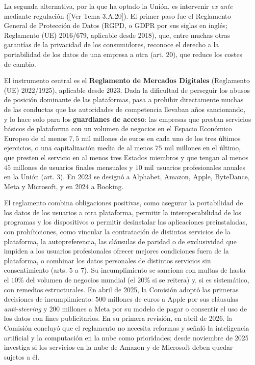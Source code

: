 \documentclass[10pt,a4paper]{article}
\newcommand{\authorfont}[1]{{\fontfamily{EBGaramond-TLF}\selectfont #1}}
\begin{document}
La segunda alternativa, por la que ha optado la Unión, es intervenir \textit{ex ante} mediante regulación ([\authorfont{Ver Tema 3.A.20}]). El primer paso fue el Reglamento General de Protección de Datos (RGPD, o GDPR por sus siglas en inglés; Reglamento (UE) 2016/679, aplicable desde 2018), que, entre muchas otras garantías de la privacidad de los consumidores, reconoce el derecho a la portabilidad de los datos de una empresa a otra (art. $20$), que reduce los costes de cambio.

El instrumento central es el \textbf{Reglamento de Mercados Digitales} (Reglamento (UE) 2022/1925), aplicable desde 2023. Dada la dificultad de perseguir los abusos de posición dominante de las plataformas, pasa a prohibir directamente muchas de las conductas que las autoridades de competencia llevaban años sancionando, y lo hace solo para los \textbf{guardianes de acceso}: las empresas que prestan servicios básicos de plataforma con un volumen de negocios en el Espacio Económico Europeo de al menos $7,5$ mil millones de euros en cada uno de los tres últimos ejercicios, o una capitalización media de al menos $75$ mil millones en el último, que presten el servicio en al menos tres Estados miembros y que tengan al menos $45$ millones de usuarios finales mensuales y $10$ mil usuarios profesionales anuales en la Unión (art. $3$). En 2023 se designó a Alphabet, Amazon, Apple, ByteDance, Meta y Microsoft, y en 2024 a Booking.

El reglamento combina obligaciones positivas, como asegurar la portabilidad de los datos de los usuarios a otra plataforma, permitir la interoperabilidad de los programas y los dispositivos o permitir desinstalar las aplicaciones preinstaladas, con prohibiciones, como vincular la contratación de distintos servicios de la plataforma, la autopreferencia, las cláusulas de paridad o de exclusividad que impiden a los usuarios profesionales ofrecer mejores condiciones fuera de la plataforma, o combinar los datos personales de distintos servicios sin consentimiento (arts. $5$ a $7$). Su incumplimiento se sanciona con multas de hasta el $10\%$ del volumen de negocios mundial (el $20\%$ si se reitera) y, si es sistemático, con remedios estructurales. En abril de 2025, la Comisión adoptó las primeras decisiones de incumplimiento: $500$ millones de euros a Apple por sus cláusulas \textit{anti-steering} y $200$ millones a Meta por su modelo de pagar o consentir el uso de los datos con fines publicitarios. En su primera revisión, en abril de 2026, la Comisión concluyó que el reglamento no necesita reformas y señaló la inteligencia artificial y la computación en la nube como prioridades; desde noviembre de 2025 investiga si los servicios en la nube de Amazon y de Microsoft deben quedar sujetos a él.
\end{document}
